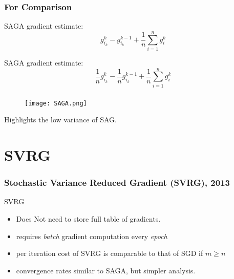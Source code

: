 \documentclass{beamer}
\begin{document}
\begin{frame}
  \frametitle{For Comparison}
  SAGA gradient estimate:
  \begin{equation}
    g_{i_k}^k - g_{i_k}^{k-1} + \frac{1}{n}\sum_{i=1}^{n} g_i^k
  \end{equation}

  SAGA gradient estimate:
  \begin{equation}
    \frac{1}{n}g_{i_k}^k - \frac{1}{n}g_{i_k}^{k-1} + \frac{1}{n}\sum_{i=1}^{n} g_i^k
  \end{equation}

\end{frame}

\begin{frame}
  \frametitle{}

  \begin{figure}[ht]
    \centering
    \texttt{[image: SAGA.png]}
  \end{figure}
  Highlights the low variance of SAG.
\end{frame}


\section{SVRG}%
\label{sec:}

\begin{frame}
  \frametitle{Stochastic Variance Reduced Gradient (SVRG), 2013}

  \begin{algorithm}[H]
    \caption{SVRG}\label{}
    \begin{algorithmic}[1]
      \Endfor{}
      \Endfor{}
    \end{algorithmic}
  \end{algorithm}

  \begin{itemize}
    \item Does Not need to store full table of gradients.
    \item requires \emph{batch} gradient computation every \emph{epoch}
    \item per iteration cost of SVRG is comparable to that of SGD if $m \ge n$
    \item convergence rates similar to SAGA, but simpler analysis.
  \end{itemize}
\end{frame}
\end{document}
